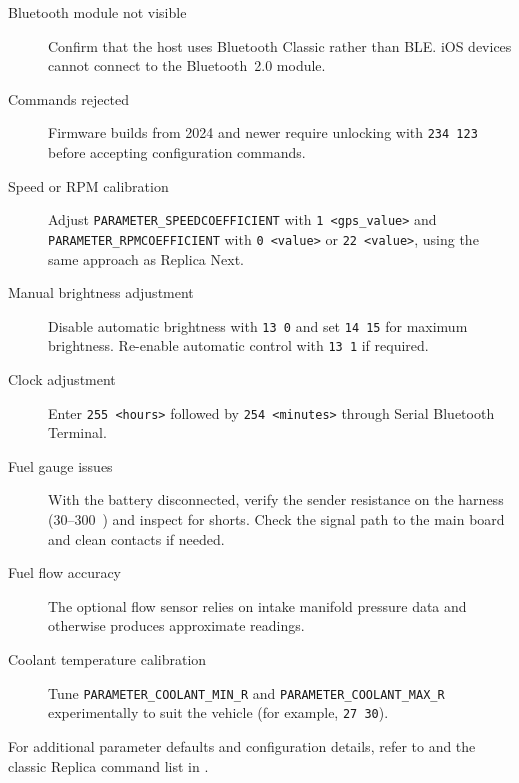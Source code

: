 \begin{description}
    \item[Bluetooth module not visible] Confirm that the host uses Bluetooth Classic rather than BLE. iOS devices cannot connect to the Bluetooth~2.0 module.
    \item[Commands rejected] Firmware builds from 2024 and newer require unlocking with \verb|234 123| before accepting configuration commands.
    \item[Speed or RPM calibration] Adjust \texttt{PARAMETER\_SPEEDCOEFFICIENT} with \verb|1 <gps_value>| and \texttt{PARAMETER\_RPMCOEFFICIENT} with \verb|0 <value>| or \verb|22 <value>|, using the same approach as Replica Next.
    \item[Manual brightness adjustment] Disable automatic brightness with \verb|13 0| and set \verb|14 15| for maximum brightness. Re-enable automatic control with \verb|13 1| if required.
    \item[Clock adjustment] Enter \verb|255 <hours>| followed by \verb|254 <minutes>| through Serial Bluetooth Terminal.
    \item[Fuel gauge issues] With the battery disconnected, verify the sender resistance on the harness (30--300~\ohm{}) and inspect for shorts. Check the signal path to the main board and clean contacts if needed.
    \item[Fuel flow accuracy] The optional flow sensor relies on intake manifold pressure data and otherwise produces approximate readings.
    \item[Coolant temperature calibration] Tune \texttt{PARAMETER\_COOLANT\_MIN\_R} and \texttt{PARAMETER\_COOLANT\_MAX\_R} experimentally to suit the vehicle (for example, \verb|27 30|).
\end{description}

For additional parameter defaults and configuration details, refer to  and the classic Replica command list in .
